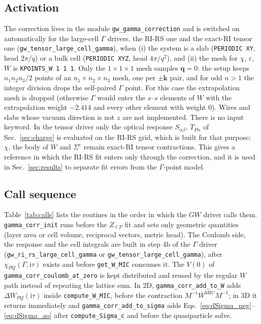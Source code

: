 \documentclass[%
 reprint,
superscriptaddress,
 amsmath,amssymb,
 aps,
prb,
]{revtex4-2}
\newcommand{\bq}{\mathbf{q}}
\newcommand{\bk}{\mathbf{k}}
\newcommand{\ii}{\mathrm{i}}
\newcommand{\MIC}{\mathrm{MIC}}
\begin{document}
\subsection{Activation}
\label{sec:activation}

The correction lives in the module \texttt{gw\_gamma\_correction} and is switched on
automatically for the large-cell $\Gamma$ drivers, the RI-RS one and the exact-RI tensor one
(\texttt{gw\_tensor\_large\_cell\_gamma}), when (i) the system is a slab
(\texttt{PERIODIC XY}, head $2\pi/q$) or a bulk cell (\texttt{PERIODIC XYZ}, head $4\pi/q^2$),
and (ii) the mesh for $\chi$, $\varepsilon$, $W$ is \texttt{KPOINTS\_W 1 1 1}. Only the
$1\times1\times1$ mesh samples $\bq=0$: the setup keeps $n_1n_2n_3/2$ points of an
$n_1\times n_2\times n_3$ mesh, one per $\pm\bk$ pair, and for odd $n>1$ the integer division
drops the self-paired $\Gamma$ point. For this case the extrapolation mesh is dropped (otherwise
$\Gamma$ would enter the $s$--$s$ elements of $W$ with the extrapolation weight $-2.414$ and
every other element with weight 0). Wires and slabs whose vacuum direction is not $z$ are not
implemented. There is no input keyword. In the tensor driver only the optical response
$S_{\alpha\beta}$, $T_{P\alpha}$ of Sec.~\ref{sec:charge} is evaluated on the RI-RS grid, which
is built for that purpose; $\chi$, the body of $W$ and $\Sigma^c$ remain exact-RI tensor
contractions. This gives a reference in which the RI-RS fit enters only through the
correction, and it is used in Sec.~\ref{sec:results} to separate fit errors from the
$\Gamma$-point model.

\subsection{Call sequence}
\label{sec:calls}

Table~\ref{tab:calls} lists the routines in the order in which the $GW$ driver calls them.
\texttt{gamma\_corr\_init} runs before the $Z_{\ell P}$ fit and sets only geometric quantities
(layer area or cell volume, reciprocal vectors, metric head). The Coulomb side, the response and
the cell integrals are built in step 4b of the $\Gamma$ driver
(\texttt{gw\_ri\_rs\_large\_cell\_gamma} or \texttt{gw\_tensor\_large\_cell\_gamma}), after
$\chi_{PQ}(\Gamma,\ii\tau)$ exists and before \texttt{get\_W\_MIC} consumes it. The $V(0)$ of
\texttt{gamma\_corr\_coulomb\_at\_zero} is kept distributed and reused by the regular $W$ path
instead of repeating the lattice sum. In 2D, \texttt{gamma\_corr\_add\_to\_W} adds
$\Delta W_{PQ}(\ii\tau)$ inside \texttt{compute\_W\_MIC}, before the contraction
$M^{-1}W^\MIC M^{-1}$; in 3D it returns immediately and
\texttt{gamma\_corr\_add\_to\_sigma} adds Eqs.~\eqref{eq:dSigma_neg}--\eqref{eq:dSigma_ao}
after \texttt{compute\_Sigma\_c} and before the quasiparticle solve.
\end{document}
